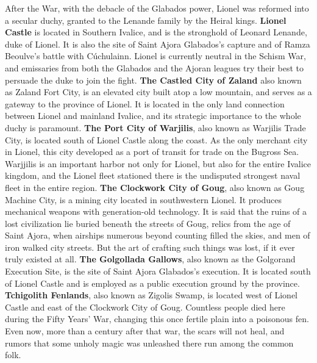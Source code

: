 After the War, with the debacle of the Glabados power, Lionel was reformed into a secular duchy, granted to the Lenande family by the Heiral kings.
\textbf{Lionel Castle} is located in Southern Ivalice, and is the stronghold of Leonard Lenande, duke of Lionel. 
It is also the site of Saint Ajora Glabados's capture and of Ramza Beoulve's battle with Cúchulainn. 
Lionel is currently neutral in the Schism War, and emissaries from both the Glabados and the Ajoran leagues try their best to persuade the duke to join the fight.
\textbf{The Castled City of Zaland} also known as Zaland Fort City, is an elevated city built atop a low mountain, and serves as a gateway to the province of Lionel. 
It is located in the only land connection between Lionel and mainland Ivalice, and its strategic importance to the whole duchy is paramount.
\textbf{The Port City of Warjilis}, also known as Warjilis Trade City, is located south of Lionel Castle along the coast.
As the only merchant city in Lionel, this city developed as a port of transit for trade on the Bugross Sea. 
Warjjilis is an important harbor not only for Lionel, but also for the entire Ivalice kingdom, and the Lionel fleet stationed there is the undisputed strongest naval fleet in the entire region.
\textbf{The Clockwork City of Goug}, also known as Goug Machine City, is a mining city located in southwestern Lionel. 
It produces mechanical weapons with generation-old technology.
It is said that the ruins of a lost civilization lie buried beneath the streets of Goug, relics from the age of Saint Ajora, when airships numerous beyond counting filled the skies, and men of iron walked city streets. 
But the art of crafting such things was lost, if it ever truly existed at all.
\textbf{The Golgollada Gallows}, also known as the Golgorand Execution Site, is the site of Saint Ajora Glabados's execution. 
It is located south of Lionel Castle and is employed as a public execution ground by the province.
\textbf{Tchigolith Fenlands}, also known as Zigolis Swamp, is located west of Lionel Castle and east of the Clockwork City of Goug.
Countless people died here during the Fifty Years' War, changing this once fertile plain into a poisonous fen. 
Even now, more than a century after that war, the scars will not heal, and rumors that some unholy magic was unleashed there run among the common folk.
%
\\\\
